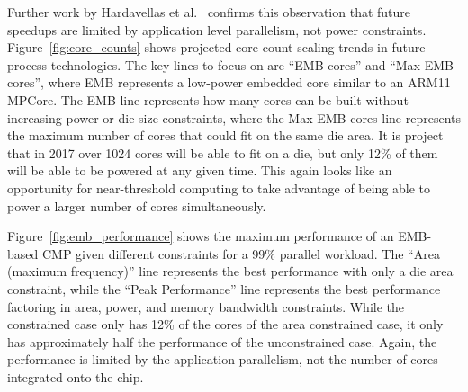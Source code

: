 Further work by Hardavellas et al.~\cite{Hardavellas:2011de} confirms this
observation that future speedups are limited by application level parallelism,
not power constraints. Figure~\ref{fig:core_counts} shows projected core count
scaling trends in future process technologies. The key lines to focus on are
``EMB cores'' and ``Max EMB cores'', where EMB represents a low-power embedded
core similar to an ARM11 MPCore. The EMB line represents how many cores can be
built without increasing power or die size constraints, where the Max EMB cores
line represents the maximum number of cores that could fit on the same die
area. It is project that in 2017 over 1024 cores will be able to fit on a die,
but only 12\% of them will be able to be powered at any given time. This again
looks like an opportunity for near-threshold computing to take advantage of
being able to power a larger number of cores simultaneously.

Figure~\ref{fig:emb_performance} shows the maximum performance of an EMB-based
CMP given different constraints for a 99\% parallel workload. The ``Area
(maximum frequency)'' line represents the best performance with only a die area
constraint, while the ``Peak Performance'' line represents the best performance
factoring in area, power, and memory bandwidth constraints. While the
constrained case only has 12\% of the cores of the area constrained case, it
only has approximately half the performance of the unconstrained case. Again,
the performance is limited by the application parallelism, not the number of
cores integrated onto the chip.

